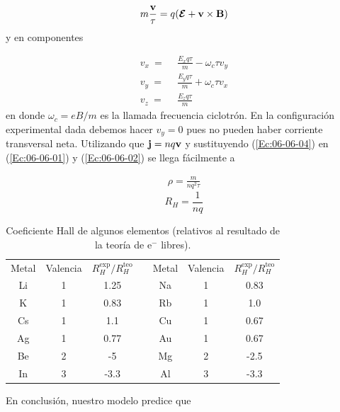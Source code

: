 \begin{eqnarray}
	m \frac{\mathbf{v}}{\tau} = q (\boldsymbol{\mathcal{E}} + \mathbf{v} \times \mathbf{B})
\end{eqnarray}
y en componentes

\begin{equation}
\begin{split}
	v_x \  = \  & \ \frac{E_x q\tau}{m} - \omega_c \tau v_y \\
	v_y \  = \  & \ \frac{E_y q\tau}{m} + \omega_c \tau v_x \\
	v_z \  = \  & \ \frac{E_z q\tau}{m}  \label{Ec:06-06-04}
\end{split}
\end{equation}
en donde $\omega_c = eB/m$ es la llamada frecuencia ciclotrón. En la configuración experimental dada debemos hacer $v_y = 0$ pues no pueden haber corriente transversal neta. Utilizando que $\mathbf{j} = nq\mathbf{v}$ y sustituyendo  (\ref{Ec:06-06-04}) en (\ref{Ec:06-06-01}) y (\ref{Ec:06-06-02}) se llega fácilmente a 

\begin{eqnarray*}
	\rho =  \frac{m}{nq^2\tau}
\end{eqnarray*}
\begin{equation}
	R_H=\frac{1}{nq} \label{Ec:06-06-05}
\end{equation}

\begin{table}[h!] \centering
\begin{tabular}{ccc c ccc}
	Metal & Valencia & $R_H^{\text{exp}}/R_H^{\text{teo}}$ & & Metal & Valencia & $R_H^{\text{exp}}/R_H^{\text{teo}}$ \\ \cline{1-3} \cline{5-7} 
	Li & 1 & 1.25 & & Na & 1 & 0.83 \\
	K & 1 & 0.83 & & Rb & 1 & 1.0 \\
	Cs & 1 & 1.1 & & Cu & 1 & 0.67 \\
	Ag & 1 & 0.77 & & Au & 1 & 0.67 \\
	Be & 2 & -5 & & Mg & 2 & -2.5 \\
	In & 3 & -3.3 & & Al & 3 & -3.3 
\end{tabular}
\caption{Coeficiente Hall de algunos elementos (relativos al resultado de la teoría de e$^-$ libres).}
\label{Tab:06-03}
\end{table}

En conclusión, nuestro modelo predice que 

